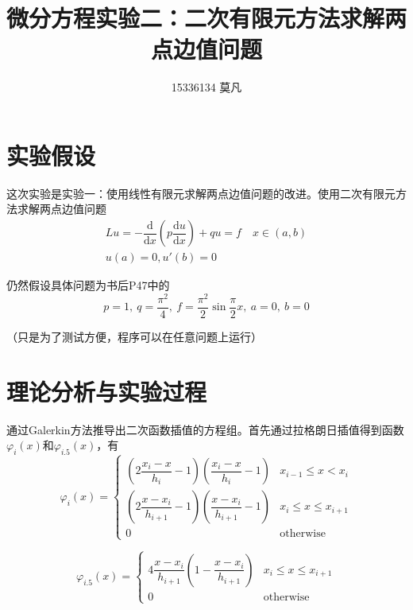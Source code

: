 \documentclass[11pt, a4paper]{article}
\begin{document}
	
\title{微分方程实验二：二次有限元方法求解两点边值问题}
\author{15336134 莫凡}
\maketitle
	
\section{实验假设}

这次实验是实验一：使用线性有限元求解两点边值问题的改进。使用二次有限元方法求解两点边值问题
\begin{equation}
	\begin{array}{c}
	Lu=-\dfrac{\mathrm{d}}{\mathrm{d}x}\left(p\dfrac{\mathrm{d}u}{\mathrm{d}x}\right)+qu=f\quad x\in (a, b)\\
	u(a)=0,u'(b)=0
	\end{array}
\end{equation}
	
仍然假设具体问题为书后P47中的
\begin{equation}
	p=1,~q=\dfrac{\pi^2}{4},~f=\dfrac{\pi^2}{2}\sin\dfrac{\pi}{2}x,~a=0,~b=0
\end{equation}

（只是为了测试方便，程序可以在任意问题上运行）

\section{理论分析与实验过程}

通过Galerkin方法推导出二次函数插值的方程组。首先通过拉格朗日插值得到函数$\varphi_i(x)$和$\varphi_{i.5}(x)$，有
\begin{equation}
	\varphi_i(x)=\left\{
	\begin{array}{cr}
		\left(2\dfrac{x_i-x}{h_i}-1\right)\left(\dfrac{x_i-x}{h_i}-1\right) & x_{i-1}\le x<x_i\\
		\left(2\dfrac{x-x_i}{h_{i+1}}-1\right)\left(\dfrac{x-x_i}{h_{i+1}}-1\right) & x_{i}\le x\le x_{i+1}\\
		0 & \text{otherwise}
	\end{array}
	\right.
\end{equation}

\begin{equation}
	\varphi_{i.5}(x)=\left\{
	\begin{array}{cr}
		4\dfrac{x-x_i}{h_{i+1}}\left(1-\dfrac{x-x_i}{h_{i+1}}\right) & x_{i}\le x\le x_{i+1}\\
		0 & \text{otherwise}
	\end{array}
	\right.
\end{equation}
\end{document}
